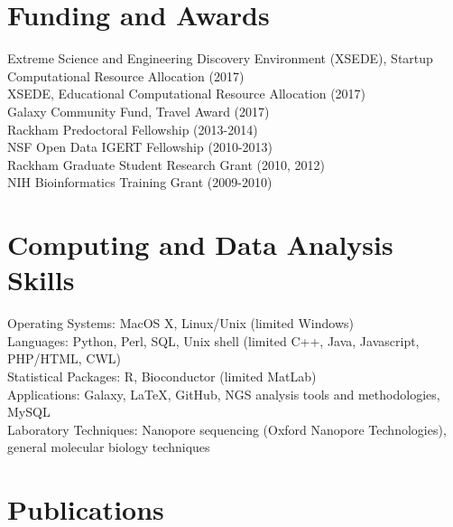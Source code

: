 \documentclass[margin,line]{res}
\begin{document}
\begin{resume}
\section{\sc Funding and Awards} 
{Extreme Science and Engineering Discovery Environment (XSEDE), Startup Computational Resource Allocation (2017)}\\
{XSEDE, Educational Computational Resource Allocation (2017)}\\
{Galaxy Community Fund, Travel Award (2017)}\\
{Rackham Predoctoral Fellowship (2013-2014)}\\
{NSF Open Data IGERT Fellowship (2010-2013)}\\
{Rackham Graduate Student Research Grant (2010, 2012)}\\
{NIH Bioinformatics Training Grant (2009-2010)}

\section{\sc Computing and Data Analysis Skills} 
Operating Systems:  MacOS X, Linux/Unix (limited Windows) \\
Languages: Python, Perl, SQL, Unix shell (limited C++, Java, Javascript, PHP/HTML, CWL)\\
Statistical Packages:  R, Bioconductor (limited MatLab)\\
Applications: Galaxy, \LaTeX, GitHub, NGS analysis tools and methodologies, MySQL\\
Laboratory Techniques: Nanopore sequencing (Oxford Nanopore Technologies), general molecular biology techniques


\section{\sc Publications}


\end{resume}
\end{document}
